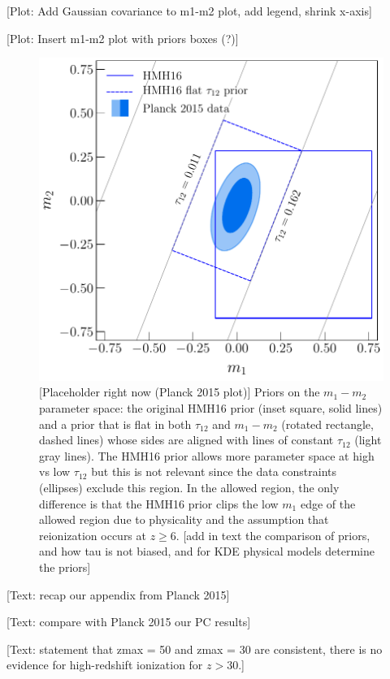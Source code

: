 \documentclass[prd,twocolumn,amsmath,amssymb,floatfix,superscriptaddress,nofootinbib]{revtex4-1}
\begin{document}
[Plot: Add Gaussian covariance to m1-m2 plot, add legend, shrink x-axis]

[Plot: Insert m1-m2 plot with priors boxes (?)]
 
 \begin{figure}
          \includegraphics[width=0.9\columnwidth]{paper/plots/plot_rotated_box_flat_tau_prior_fac_0p8.pdf}
          \caption
          {[Placeholder right now (Planck 2015 plot)] Priors on the $m_1-m_2$ parameter space: the original HMH16 prior (inset square, solid lines) and a prior that is flat in
          both $\tau_{12}$ and $m_1-m_2$ (rotated rectangle, dashed lines) whose sides are aligned with lines of
          constant $\tau_{12}$ (light gray lines).   The HMH16 prior allows more parameter space at high vs low $\tau_{12}$ but this
          is not relevant since the data constraints (ellipses) exclude this region.  In the allowed region, the only difference is that the HMH16 prior clips the low $m_1$ edge of the allowed region due to physicality and the assumption that reionization occurs at
          $z\ge 6$. [add in text the comparison of priors, and how tau is not biased, and for KDE physical models determine the priors]}  \label{fig:prior_box}
\end{figure}

[Text: recap our appendix from Planck 2015]

[Text: compare with Planck 2015 our PC results]

[Text: statement that zmax = 50 and zmax = 30 are consistent, there is no evidence for high-redshift ionization for $z>30$.]
\end{document}
